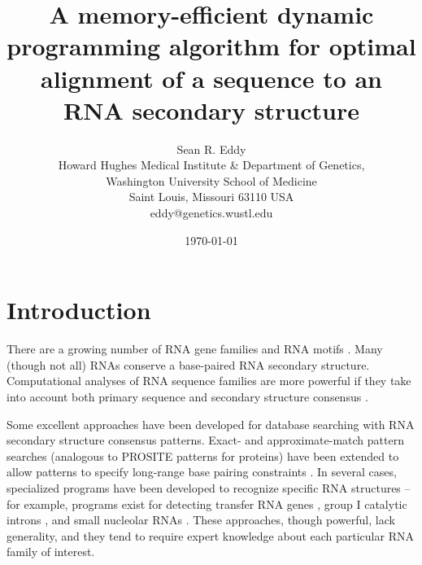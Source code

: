 \documentclass[11pt]{article}
\begin{document}
\title{A memory-efficient dynamic programming algorithm for optimal
alignment of a sequence to an RNA secondary structure}
\author{Sean R. Eddy\\
Howard Hughes Medical Institute \& Department of Genetics, \\
Washington University School of Medicine \\
Saint Louis, Missouri 63110 USA \\
eddy@genetics.wustl.edu}  
\date{\today}
\maketitle


\section{Introduction}

There are a growing number of RNA gene families and RNA motifs
\cite{Eddy01,Erdmann01}. Many (though not all) RNAs conserve a
base-paired RNA secondary structure. Computational analyses of RNA
sequence families are more powerful if they take into account both
primary sequence and secondary structure consensus
\cite{Eddy02,Dandekar95}. 

Some excellent approaches have been developed for database searching
with RNA secondary structure consensus patterns. Exact- and
approximate-match pattern searches (analogous to PROSITE patterns for
proteins) have been extended to allow patterns to specify long-range
base pairing constraints \cite{Laferriere94,Dsouza97}. In several
cases, specialized programs have been developed to recognize specific
RNA structures \cite{Dandekar95} -- for example, programs exist for
detecting transfer RNA genes
\cite{Fichant91,El-MabroukLisacek96,LoweEddy97}, group I catalytic
introns \cite{Lisacek94}, and small nucleolar RNAs
\cite{Nicoloso96,LoweEddy98}. These approaches, though powerful, lack
generality, and they tend to require expert knowledge about each
particular RNA family of interest.
\end{document}
